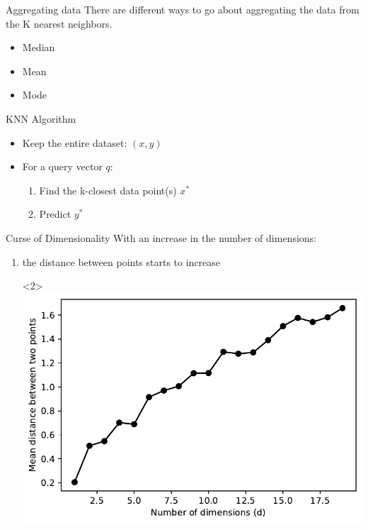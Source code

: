 \documentclass[usenames,dvipsnames]{beamer}
\begin{document}
\begin{frame}{Aggregating data}
	There are different ways to go about aggregating the data from the K nearest neighbors.
	
	
	\begin{itemize}
		\item Median
		\item Mean
		\item Mode
	\end{itemize}
\end{frame}
\begin{frame}{KNN Algorithm}
\begin{itemize}
\item<1-> Keep the entire dataset: ${(x,y)}$
\item<2-> For a query vector $q$:
\begin{enumerate}
\item<3-> Find the k-closest data point(s) $x^*$
\item<4-> Predict $y^*$
\end{enumerate}
\end{itemize}
\end{frame}

\begin{frame}{Curse of Dimensionality}
With an increase in the number of dimensions:
\begin{enumerate}
\item<2-> the distance between points starts to increase
\item[]<2> {\centering \includegraphics[height=0.6\textheight]{../assets/knn/figures/curse_dist.pdf}}
\end{enumerate}
\end{frame}
\end{document}
